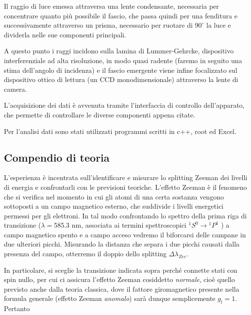 \documentclass{article}
\begin{document}
	Il raggio di luce emessa attraversa una lente condensante, necessaria 
	per concentrare quanto più possibile il fascio, che passa quindi per una 
	fenditura e successivamente attraverso un prisma, necessario per ruotare di 
	$90 ^{\circ}$ la luce e dividerla nelle sue componenti principali. 
	
	A questo punto i raggi incidono sulla lamina di Lummer-Gehrcke, dispositivo
	interferenziale ad alta risoluzione, in modo quasi
	radente (faremo in seguito una stima dell'angolo di incidenza) e il fascio 
	emergente viene infine focalizzato sul dispositivo ottico di lettura (un CCD
	monodimensionale) attraverso la lente di camera.
	
	
	L'acquisizione dei dati è avvenuta tramite l'interfaccia di controllo dell'apparato, che permette di controllare le diverse componenti appena citate.
	
	Per l'analisi dati sono stati utilizzati programmi scritti in c++, root ed Excel.
	
	\subsection*{Compendio di teoria}
	
	L'esperienza è incentrata sull'identificare e misurare lo splitting 
	Zeeman dei livelli di energia e confrontarli con le previsioni teoriche. L'effetto Zeeman è il fenomeno che si verifica nel momento in cui gli
	atomi di una certa sostanza vengono sottoposti a un campo magnetico 
	esterno, che suddivide i livelli energetici permessi per gli elettroni.
	In tal modo confrontando lo spettro della prima riga di transizione 
	($\lambda = $585.3 nm, associata ai termini spettroscopici
	$^1S^0 \rightarrow {}^1P^1$ ) a campo magnetico spento e a campo 
	acceso vedremo 
	il biforcarsi delle campane in due ulteriori picchi. Misurando la
	distanza che separa i due picchi causati dalla presenza del campo,
	otterremo il doppio dello splitting $\Delta\lambda_{Zee} $.
	
	In particolare, si sceglie la transizione indicata sopra perché connette
	stati con spin nullo, per cui ci assicura l'effetto
	Zeeman cosiddetto \textit{normale}, cioè quello previsto anche dalla 
	teoria classica, dove il fattore giromagnetico presente nella formula 
	generale (effetto Zeeman \textit{anomalo}) sarà dunque semplicemente
	$g_l = 1$. Pertanto
	
\end{document}
